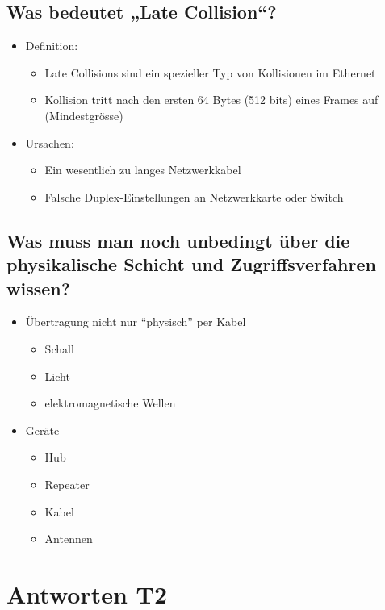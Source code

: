 \subsection*{Was bedeutet „Late Collision“?}
\begin{itemize}
    \item Definition:
    \begin{itemize}
        \item Late Collisions sind ein spezieller Typ von Kollisionen im Ethernet
        \item Kollision tritt nach den ersten 64 Bytes (512 bits) eines Frames auf (Mindestgrösse)
    \end{itemize}
    \item Ursachen:
    \begin{itemize}
        \item Ein wesentlich zu langes Netzwerkkabel
        \item Falsche Duplex-Einstellungen an Netzwerkkarte oder Switch
    \end{itemize}
\end{itemize}

\subsection*{Was muss man noch unbedingt über die physikalische Schicht und Zugriffsverfahren wissen?}
\begin{itemize}
    \item Übertragung nicht nur "`physisch"' per Kabel
    \begin{itemize}
        \item Schall
        \item Licht
        \item elektromagnetische Wellen
    \end{itemize}
    \item Geräte
    \begin{itemize}
        \item Hub
        \item Repeater
        \item Kabel
        \item Antennen
    \end{itemize}
\end{itemize}

\section{Antworten T2}
